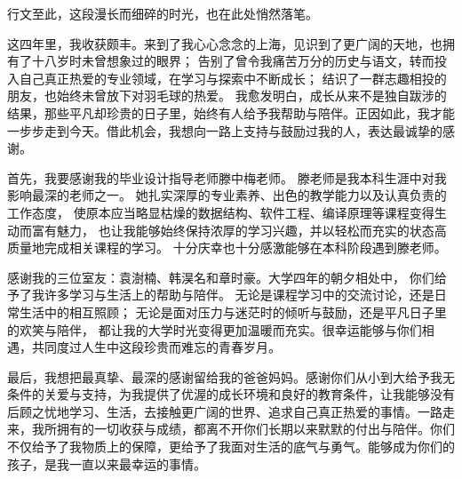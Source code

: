 \begin{acknowledgement}

    行文至此，这段漫长而细碎的时光，也在此处悄然落笔。

    这四年里，我收获颇丰。来到了我心心念念的上海，见识到了更广阔的天地，也拥有了十八岁时未曾想象过的眼界；
    告别了曾令我痛苦万分的历史与语文，转而投入自己真正热爱的专业领域，在学习与探索中不断成长；
    结识了一群志趣相投的朋友，也始终未曾放下对羽毛球的热爱。
    我愈发明白，成长从来不是独自跋涉的结果，那些平凡却珍贵的日子里，始终有人给予我帮助与陪伴。正因如此，我才能一步步走到今天。借此机会，我想向一路上支持与鼓励过我的人，表达最诚挚的感谢。

    首先，我要感谢我的毕业设计指导老师滕中梅老师。
    滕老师是我本科生涯中对我影响最深的老师之一。
    她扎实深厚的专业素养、出色的教学能力以及认真负责的工作态度，
    使原本应当略显枯燥的数据结构、软件工程、编译原理等课程变得生动而富有魅力，
    也让我能够始终保持浓厚的学习兴趣，并以轻松而充实的状态高质量地完成相关课程的学习。
    十分庆幸也十分感激能够在本科阶段遇到滕老师。

    感谢我的三位室友：袁澍楠、韩淏名和章时豪。大学四年的朝夕相处中，
    你们给予了我许多学习与生活上的帮助与陪伴。
    无论是课程学习中的交流讨论，还是日常生活中的相互照顾；
    无论是面对压力与迷茫时的倾听与鼓励，还是平凡日子里的欢笑与陪伴，
    都让我的大学时光变得更加温暖而充实。很幸运能够与你们相遇，共同度过人生中这段珍贵而难忘的青春岁月。

    最后，我想把最真挚、最深的感谢留给我的爸爸妈妈。感谢你们从小到大给予我无条件的关爱与支持，为我提供了优渥的成长环境和良好的教育条件，让我能够没有后顾之忧地学习、生活，去接触更广阔的世界、追求自己真正热爱的事情。一路走来，我所拥有的一切收获与成绩，都离不开你们长期以来默默的付出与陪伴。你们不仅给予了我物质上的保障，更给予了我面对生活的底气与勇气。能够成为你们的孩子，是我一直以来最幸运的事情。





\end{acknowledgement}

